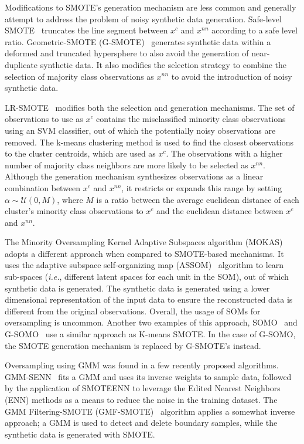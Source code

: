 Modifications to SMOTE's generation mechanism are less common and generally
attempt to address the problem of noisy synthetic data generation. Safe-level
SMOTE~\cite{bunkhumpornpat2009safe} truncates the line segment between $x^c$
and $x^{nn}$ according to a safe level ratio. Geometric-SMOTE
(G-SMOTE)~\cite{Douzas2019} generates synthetic data within a
deformed and truncated hypersphere to also avoid the generation of
near-duplicate synthetic data. It also modifies the selection strategy to
combine the selection of majority class observations as $x^{nn}$ to avoid the
introduction of noisy synthetic data. 

LR-SMOTE~\cite{liang2020lr} modifies both the selection and generation
mechanisms. The set of observations to use as $x^c$ contains the misclassified
minority class observations using an SVM classifier, out of which the
potentially noisy observations are removed. The k-means clustering method is
used to find the closest observations to the cluster centroids, which are used
as $x^c$. The observations with a higher number of majority class neighbors
are more likely to be selected as $x^{nn}$. Although the generation mechanism
synthesizes observations as a linear combination between $x^c$ and $x^{nn}$,
it restricts or expands this range by setting $\alpha \sim \mathcal{U}(0, M)$,
where $M$ is a ratio between the average euclidean distance of each cluster's
minority class observations to $x^c$ and the euclidean distance between $x^c$
and $x^{nn}$.

The Minority Oversampling Kernel Adaptive Subspaces algorithm
(MOKAS)~\cite{lin2017minority} adopts a different approach when compared to
SMOTE-based mechanisms. It uses the adaptive subspace self-organizing map
(ASSOM)~\cite{kohonen1996emergence} algorithm to learn sub-spaces
(\textit{i.e.}, different latent spaces for each unit in the SOM), out of
which synthetic data is generated. The synthetic data is generated using a
lower dimensional representation of the input data to ensure the reconstructed
data is different from the original observations. Overall, the usage of SOMs
for oversampling is uncommon. Another two examples of this approach,
SOMO~\cite{Douzas2017} and G-SOMO~\cite{douzas2021g} use a similar
approach as K-means SMOTE\@. In the case of G-SOMO, the SMOTE
generation mechanism is replaced by G-SMOTE's instead.

Oversampling using GMM was found in a few recently proposed algorithms.
GMM-SENN~\cite{xing2022predict} fits a GMM and uses its inverse weights to
sample data, followed by the application of SMOTEENN to leverage the Edited
Nearest Neighbors (ENN) methods as a means to reduce the noise in the training
dataset. The GMM Filtering-SMOTE (GMF-SMOTE)~\cite{xu2022synthetic} algorithm
applies a somewhat inverse approach; a GMM is used to detect and delete
boundary samples, while the synthetic data is generated with SMOTE.

